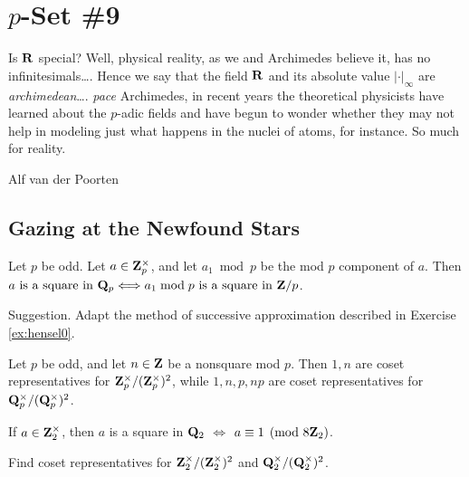 \chapter*{$p$-Set \#9}


\setlength{\epigraphwidth}{0.45\textwidth}
\epigraph{Is $\mathbf{R}$ special? Well, physical reality, as we and Archimedes believe it, has no infinitesimals\dots. Hence we say that the field $\mathbf{R}$ and its
absolute value $|\cdot|_{\infty}$ are \emph{archimedean}\dots. 
\emph{pace} Archimedes, in recent years the theoretical physicists have learned about the $p$-adic fields and
have begun to wonder whether they may not help in modeling just what
happens in the nuclei of atoms, for instance. So much for reality.}{Alf van der Poorten}
\setlength{\epigraphwidth}{0.45\textwidth}


\section*{Gazing at the Newfound Stars}
\begin{prob}\label{prob:99} Let $p$ be odd. Let $a \in \mathbf{Z}_p^{\times}$, and let $a_1 \bmod{p}$ be the mod $p$ component of $a$. Then $a \text{ is a square in $\mathbf{Q}_p$} \Longleftrightarrow a_1\bmod{p} \text{ is a square in $\mathbf{Z}/p$}$. 

{\scriptsize Suggestion. Adapt the method of successive approximation described in Exercise \ref{ex:hensel0}.}
\end{prob}

\begin{prob}\label{prob:100} Let $p$ be odd, and let $n \in \mathbf{Z}$ be a nonsquare mod $p$. Then $1,  n$ are coset representatives for $\mathbf{Z}_p^{\times}/(\mathbf{Z}_p^{\times})^2$, while $1, n, p, np$ are coset representatives for $\mathbf{Q}_p^{\times}/(\mathbf{Q}_p^{\times})^2$.  
\end{prob}

\begin{prob}\label{prob:101} If $a\in \mathbf{Z}_2^{\times}$, then $a$ is a square in $\mathbf{Q}_2$ $\Longleftrightarrow$ $a\equiv 1\pmod{8\mathbf{Z}_2}$.
\end{prob}


\begin{prob}\label{prob:102} Find coset representatives for $\mathbf{Z}_2^{\times}/(\mathbf{Z}_2^{\times})^2$ and $\mathbf{Q}_2^{\times}/(\mathbf{Q}_2^{\times})^2$. 
\end{prob}

